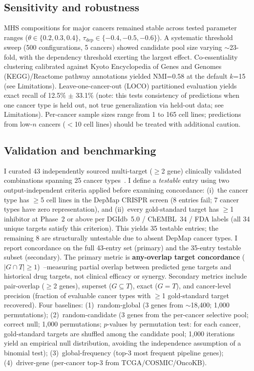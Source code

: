 \documentclass[times, twoside, watermark]{zHenriquesLab-StyleBioRxiv}
\begin{document}
\subsection*{Sensitivity and robustness}
MHS compositions for major cancers remained stable across tested parameter ranges ($\theta \in \{0.2, 0.3, 0.4\}$, $\tau_{\text{dep}} \in \{-0.4, -0.5, -0.6\}$). A systematic threshold sweep (500 configurations, 5 cancers) showed candidate pool size varying $\sim$23-fold, with the dependency threshold exerting the largest effect. Co-essentiality clustering calibrated against Kyoto Encyclopedia of Genes and Genomes (KEGG)/Reactome pathway annotations yielded NMI=0.58 at the default $k$=15 (see Limitations). Leave-one-cancer-out (LOCO) partitioned evaluation yields exact recall of 12.5\% $\pm$ 33.1\% (note: this tests consistency of predictions when one cancer type is held out, not true generalization via held-out data; see Limitations). Per-cancer sample sizes range from 1 to 165 cell lines; predictions from low-$n$ cancers ($<$10 cell lines) should be treated with additional caution.

\subsection*{Validation and benchmarking}
I curated 43 independently sourced multi-target ($\geq$2 gene) clinically validated combinations spanning 25 cancer types~\cite{Long2014,Planchard2016,Kopetz2019,Larkin2014,Park2021,Sequist2020,Baselga2012,Turner2015,Motzer2015,Daver2022,Ciruelos2024,Bhardwaj2019,Liaki2025}. I define a \emph{testable} entry using two output-independent criteria applied before examining concordance: (i)~the cancer type has $\geq$5 cell lines in the DepMap CRISPR screen (8 entries fail; 7 cancer types have zero representation), and (ii)~every gold-standard target has $\geq$1 inhibitor at Phase~2 or above per DGIdb~5.0 / ChEMBL~34 / FDA labels (all 34 unique targets satisfy this criterion). This yields 35 testable entries; the remaining 8 are structurally untestable due to absent DepMap cancer types. I report concordance on the full 43-entry set (primary) and the 35-entry testable subset (secondary). The primary metric is \textbf{any-overlap target concordance} ($|G \cap T| \geq 1$)~\cite{Julkunen2023}--measuring partial overlap between predicted gene targets and historical drug targets, not clinical efficacy or synergy. Secondary metrics include pair-overlap ($\geq$2 genes), superset ($G \subseteq T$), exact ($G = T$), and cancer-level precision (fraction of evaluable cancer types with $\geq$1 gold-standard target recovered). Four baselines: (1)~random-global (3 genes from $\sim$18,400; 1{,}000 permutations); (2)~random-candidate (3 genes from the per-cancer selective pool; correct null; 1{,}000 permutations; $p$-values by permutation test: for each cancer, gold-standard targets are shuffled among the candidate pool; 1{,}000 iterations yield an empirical null distribution, avoiding the independence assumption of a binomial test); (3)~global-frequency (top-3 most frequent pipeline genes); (4)~driver-gene (per-cancer top-3 from TCGA/COSMIC/OncoKB).
\end{document}
